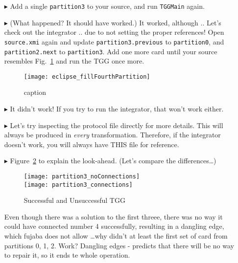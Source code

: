 \begin{itemize}

\item[$\blacktriangleright$] Add a single \texttt{partition3} to your source, and run \texttt{TGGMain} again.

\item[$\blacktriangleright$] (What happened? It should have worked.) It worked, although .. Let's check out the integrator .. due to not setting the proper
references! Open \texttt{source.xmi} again and update \texttt{partition3.previous} to \texttt{partition0}, and \texttt{partition2.next} to \texttt{partition3}.
Add one more card until your source resembles Fig.~\ref{fig:fourthPartitionStart} and run the TGG once more.

\begin{figure}[htbp]
\begin{center}
  \texttt{[image: eclipse\_fillFourthPartition]}
  \caption{caption}
  \label{fig:fourthPartitionStart}
\end{center}
\end{figure}

\item[$\blacktriangleright$] It didn't work! If you try to run the integrator, that won't work either.


\item[$\blacktriangleright$] Let's try inspecting the protocol file directly for more details. This will always be produced in \emph{every} transformation.
Therefore, if the integrator doesn't work, you will always have THIS file for reference.

\item[$\blacktriangleright$] Figure~\ref{fig:partition3comparison} to explain the look-ahead. (Let's compare the differences\ldots)

\newpage

\begin{figure}[htbp]
 	\centering
   \texttt{[image: partition3\_noConnections]}
   \\ \vspace{1cm}
    \texttt{[image: partition3\_connections]}
 	\caption{Successful and Unsuccessful TGG}
 	\label{fig:partition3comparison}
\end{figure}
\FloatBarrier

Even though there was a solution to the first threee, there was no way it could have connected number 4 successfully, resulting
in a dangling edge, which fujaba does not allow \ldots why didn't at least the first set of card from partitions 0, 1, 2. Work? Dangling edges - predicts that there
will be no way to repair it, so it ends te whole operation.


\end{itemize}
